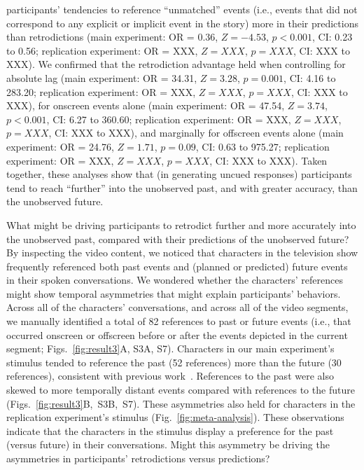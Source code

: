 \documentclass[10pt]{article}
\newcommand{\references}{S3}
\newcommand{\characterRefs}{S7}
\begin{document}
participants' tendencies to reference ``unmatched'' events (i.e., events that
did not correspond to any explicit or implicit event in the story) more in
their predictions than retrodictions (main experiment: OR = 0.36, $Z = -4.53$,
$p < 0.001$, CI: 0.23 to 0.56; replication experiment: OR = XXX, $Z = XXX$, $p
= XXX$, CI: XXX to XXX). We confirmed that the retrodiction advantage held when
controlling for absolute lag (main experiment: OR = 34.31, $Z = 3.28$, $p =
0.001$, CI: 4.16 to 283.20; replication experiment: OR = XXX, $Z = XXX$, $p =
XXX$, CI: XXX to XXX), for onscreen events alone (main experiment: OR = 47.54,
$Z = 3.74$, $p < 0.001$, CI: 6.27 to 360.60; replication experiment: OR = XXX,
$Z = XXX$, $p = XXX$, CI: XXX to XXX), and marginally for offscreen events
alone (main experiment: OR = 24.76, $Z = 1.71$, $p = 0.09$, CI: 0.63 to 975.27;
replication experiment: OR = XXX, $Z = XXX$, $p = XXX$, CI: XXX to XXX). Taken
together, these analyses show that (in generating uncued responses)
participants tend to reach ``further'' into the unobserved past, and with
greater accuracy, than the unobserved future.

What might be driving participants to retrodict further and more accurately
into the unobserved past, compared with their predictions of the unobserved
future? By inspecting the video content, we noticed that characters in the
television show frequently referenced both past events and (planned or
predicted) future events in their spoken conversations. We wondered whether the
characters' references might show temporal asymmetries that might explain
participants' behaviors. Across all of the characters' conversations, and
across all of the video segments, we manually identified a total of 82
references to past or future events (i.e., that occurred onscreen or offscreen
before or after the events depicted in the current segment;
Figs.~\ref{fig:result3}A, \references A, \characterRefs). Characters in our
main experiment's stimulus tended to reference the past (52 references) more
than the future (30 references), consistent with previous
work~\citep{DemiEtal18}. References to the past were also skewed to more
temporally distant events compared with references to the future
(Figs.~\ref{fig:result3}B,~\references B,~\characterRefs). These asymmetries
also held for characters in the replication experiment's stimulus
(Fig.~\ref{fig:meta-analysis}). These observations indicate that the characters
in the stimulus display a preference for the past (versus future) in their
conversations. Might this asymmetry be driving the asymmetries in participants'
retrodictions versus predictions?
\end{document}
